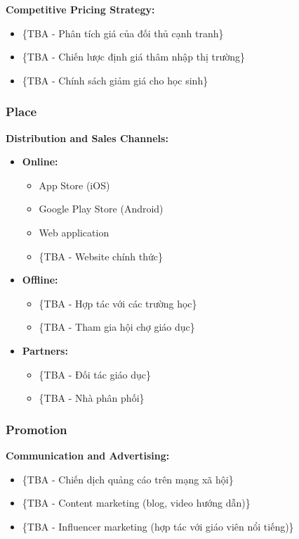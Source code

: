 \textbf{Competitive Pricing Strategy:}
\begin{itemize}
    \item \{TBA - Phân tích giá của đối thủ cạnh tranh\}
    \item \{TBA - Chiến lược định giá thâm nhập thị trường\}
    \item \{TBA - Chính sách giảm giá cho học sinh\}
\end{itemize}

\subsubsection{Place}
\textbf{Distribution and Sales Channels:}
\begin{itemize}
    \item \textbf{Online:}
    \begin{itemize}
        \item App Store (iOS)
        \item Google Play Store (Android)
        \item Web application
        \item \{TBA - Website chính thức\}
    \end{itemize}
    \item \textbf{Offline:}
    \begin{itemize}
        \item \{TBA - Hợp tác với các trường học\}
        \item \{TBA - Tham gia hội chợ giáo dục\}
    \end{itemize}
    \item \textbf{Partners:}
    \begin{itemize}
        \item \{TBA - Đối tác giáo dục\}
        \item \{TBA - Nhà phân phối\}
    \end{itemize}
\end{itemize}

\subsubsection{Promotion}
\textbf{Communication and Advertising:}
\begin{itemize}
    \item \{TBA - Chiến dịch quảng cáo trên mạng xã hội\}
    \item \{TBA - Content marketing (blog, video hướng dẫn)\}
    \item \{TBA - Influencer marketing (hợp tác với giáo viên nổi tiếng)\}
\end{itemize}

